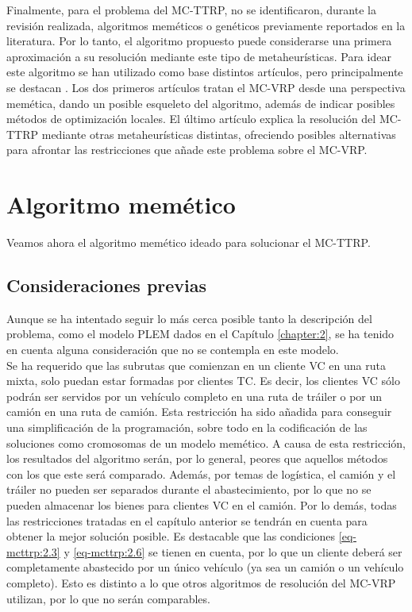 Finalmente, para el problema del MC-TTRP, no se identificaron, durante la revisión realizada, algoritmos meméticos o genéticos previamente reportados en la literatura. Por lo tanto, el algoritmo propuesto puede considerarse una primera aproximación a su resolución mediante este tipo de metaheurísticas. Para idear este algoritmo se han utilizado como base distintos artículos, pero principalmente se destacan \cite{MC-VRP-Memetic-ElFallahi,MC-VRP-Stochastic-Mendoza,laura-mcttrp}. Los dos primeros artículos tratan el MC-VRP desde una perspectiva memética, dando un posible esqueleto del algoritmo, además de indicar posibles métodos de optimización locales. El último artículo explica la resolución del MC-TTRP mediante otras metaheurísticas distintas, ofreciendo posibles alternativas para afrontar las restricciones que añade este problema sobre el MC-VRP. 

\section{Algoritmo memético}\label{section:MA}
Veamos ahora el algoritmo memético ideado para solucionar el MC-TTRP.
\subsection{Consideraciones previas} \label{section:cons-tom}
Aunque se ha intentado seguir lo más cerca posible tanto la descripción del problema, como el modelo PLEM dados en el Capítulo \ref{chapter:2}, se ha tenido en cuenta alguna consideración que no se contempla en este modelo.\\

Se ha requerido que las subrutas que comienzan en un cliente VC en una ruta mixta, solo puedan estar formadas por clientes TC. Es decir, los clientes VC sólo podrán ser servidos por un vehículo completo en una ruta de tráiler o por un camión en una ruta de camión. Esta restricción ha sido añadida para conseguir una simplificación de la programación, sobre todo en la codificación de las soluciones como cromosomas de un modelo memético. A causa de esta restricción, los resultados del algoritmo serán, por lo general, peores que aquellos métodos con los que este será comparado. Además, por temas de logística, el camión y el tráiler no pueden ser separados durante el abastecimiento, por lo que no se pueden almacenar los bienes para clientes VC en el camión. Por lo demás, todas las restricciones tratadas en el capítulo anterior se tendrán en cuenta para obtener la mejor solución posible. Es destacable que las condiciones \eqref{eq-mcttrp:2.3} y \eqref{eq-mcttrp:2.6} se tienen en cuenta, por lo que un cliente deberá ser completamente abastecido por un único vehículo (ya sea un camión o un vehículo completo). Esto es distinto a lo que otros algoritmos de resolución del MC-VRP utilizan, por lo que no serán comparables. 

